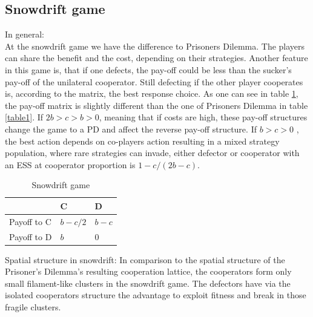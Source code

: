 \documentclass[DIV=calc, paper=a4, fontsize=11pt, twocolumn]{scrartcl}	 %
\begin{document}
\subsection*{Snowdrift game}

In general: \\
At the snowdrift game we have the difference to Prisoners Dilemma. The players can share the benefit and the cost, depending on their strategies. Another feature in this game is, that if one defects, the pay-off could be less than the sucker's pay-off of the unilateral cooperator. Still defecting if the other player cooperates is, according to the matrix, the best response choice. As one can see in table \ref{table2}, the pay-off matrix is slightly different than the one of Prisoners Dilemma in table \ref{table1}. 
If $2b > c > b > 0$, meaning that if costs are high, these pay-off structures change the game to a PD and affect the reverse pay-off structure. If $b > c > 0$ , the best action depends on co-players action resulting in a mixed strategy population, where rare strategies can invade, either defector or cooperator with an ESS at cooperator proportion is $1- c/(2b-c)$. 


\begin{table}[h]
\caption{Snowdrift game}
\label{table2}
\centering
\begin{tabular}{lll}
 & C & D \\
\midrule
Payoff to C & $b-c/2$ & $b-c$ \\
Payoff to D & $b$ & $0$ \\
\bottomrule
\end{tabular}
\end{table}

Spatial structure in snowdrift: 
In comparison to the spatial structure  of the Prisoner's Dilemma's resulting cooperation lattice, the cooperators form only small filament-like clusters in the snowdrift game. The defectors have via the isolated cooperators structure the advantage to exploit fitness and break in those fragile clusters.
\end{document}

